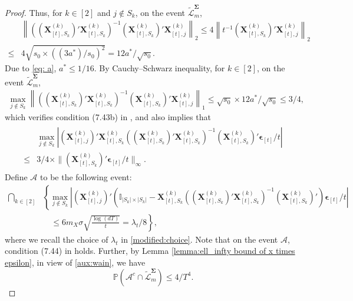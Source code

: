 \documentclass[aos,preprint]{imsart}
\theoremstyle{plain}
\theoremstyle{definition}
\newcommand{\bd}[1]{\boldsymbol{#1}}
\newcommand{\bX}{\boldsymbol{X}}
\newcommand{\bSigma}{\boldsymbol{\Sigma}}
\newcommand{\bepsilon}{\bd{\epsilon}}
\newcommand{\cA}{\mathcal{A}}
\newcommand{\Pro}{\mathbb{P}}
\newcommand{\tL}{\widetilde{\mathcal{L}}}
\begin{document}
\begin{appendix}
\begin{proof}
Thus, for $k \in [2]$ and  $j \not\in S_k$, on the event $\tL_m^{\bSigma}$,
\begin{align*}
&\left\|\left( (\bX_{[t], S_k}^{(k)})' \bX_{[t], S_k}^{(k)} \right)^{-1} (\bX_{[t], S_k}^{(k)})' \bX_{[t], j}^{(k)} \right\|_2
\leq 4 \left\|t^{-1}(\bX_{[t], S_k}^{(k)})' \bX_{[t], j}^{(k)} \right\|_2 \\
\leq &4 \sqrt{s_0 \times ((3a^*)/s_0)^2} = 12a^*/\sqrt{s_0}.
\end{align*}
Due to \eqref{eq: a}, $a^* \leq 1/16$. By Cauchy–Schwarz inequality, for $k \in [2]$, on the event $\tL_m^{\bSigma}$, 
\begin{align}\label{aux:mutual_inco}
  \max_{j \not\in S_k}  \left\|\left( (\bX_{[t], S_k}^{(k)})' \bX_{[t], S_k}^{(k)} \right)^{-1} (\bX_{[t], S_k}^{(k)})' \bX_{[t], j}^{(k)} \right\|_1 \leq \sqrt{s_0} \times 12a^*/\sqrt{s_0} \leq 3/4,
\end{align}
which verifies condition (7.43b) in \cite{wainwright2019high}, and also implies that 
\begin{align}\label{aux:wain}
\begin{split}
 &\max_{j \not\in S_k}  \left| ( \bX_{[t], j}^{(k)})'\bX_{[t], S_k}^{(k)} \left( (\bX_{[t], S_k}^{(k)})' \bX_{[t], S_k}^{(k)} \right)^{-1} (\bX_{[t], S_k}^{(k)})' \bepsilon_{[t]}/t  
\right| \\
\leq & 3/4 \times \|(\bX_{[t], S_k}^{(k)})' \bepsilon_{[t]}/t  \|_{\infty}.
\end{split}
\end{align}
Define $\mathcal{A}$ to be the following event:
\begin{align*}
\bigcap_{k \in [2]} & \left\{ \max_{j \not\in S_k}  \left| ( \bX_{[t], j}^{(k)})' \left(\mathbb{I}_{|S_k| \times |S_k|} - \bX_{[t], S_k}^{(k)} \left( (\bX_{[t], S_k}^{(k)})' \bX_{[t], S_k}^{(k)} \right)^{-1} (\bX_{[t], S_k}^{(k)})'\right) \bepsilon_{[t]}/t  
\right|  
    \right. \\
    &\left. \quad \leq 6m_X\sigma \sqrt{\frac{\log(dT)}{t}} = \lambda_t/8 \right\},
\end{align*}
where we recall the choice of $\lambda_t$ in \eqref{modified:choice}. Note that on the event $\cA$, condition (7.44) in \cite{wainwright2019high} holds. Further, by Lemma \ref{lemma:ell_infty bound of x times epsilon}, in view of \eqref{aux:wain}, we have
\begin{equation*}
    \Pro\left( \mathcal{A}^c \cap \tL_m^{\bSigma}\right) \leq  {4}/{T^4}.
\end{equation*}
 

\end{proof}
\end{appendix}
\end{document}
